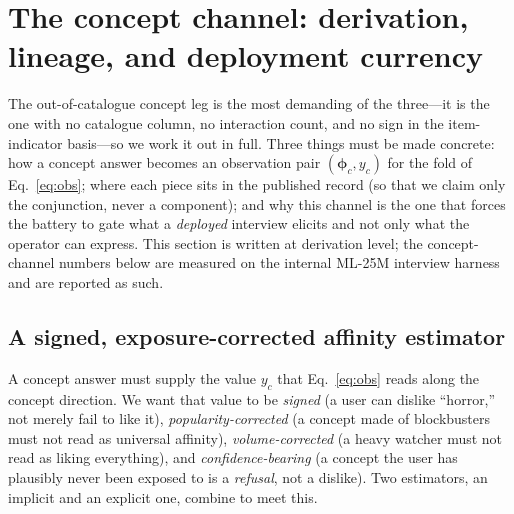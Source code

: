\documentclass[11pt]{article}
\newcommand{\bphi}{\boldsymbol{\phi}}
\begin{document}
\section{The concept channel: derivation, lineage, and deployment currency}\label{sec:concept}

The out-of-catalogue concept leg is the most demanding of the three---it is the one with no
catalogue column, no interaction count, and no sign in the item-indicator basis---so we work it out in full. Three
things must be made concrete: how a concept answer becomes an observation pair $(\bphi_c, y_c)$ for the fold
of Eq.~\eqref{eq:obs}; where each piece sits in the published record (so that we claim only the conjunction, never
a component); and why this channel is the one that forces the battery to gate what a \emph{deployed} interview
elicits and not only what the operator can express. This section
is written at derivation level; the concept-channel numbers below are measured on the internal ML-25M interview
harness and are reported as such.

\subsection{A signed, exposure-corrected affinity estimator}\label{sec:concept:est}

A concept answer must supply the value $y_c$ that Eq.~\eqref{eq:obs} reads along the concept direction. We want that
value to be \emph{signed} (a user can dislike ``horror,'' not merely fail to like it), \emph{popularity-corrected} (a
concept made of blockbusters must not read as universal affinity), \emph{volume-corrected} (a heavy watcher must not
read as liking everything), and \emph{confidence-bearing} (a concept the user has plausibly never been exposed to is a
\emph{refusal}, not a dislike). Two estimators, an implicit and an explicit one, combine to meet this.
\end{document}
